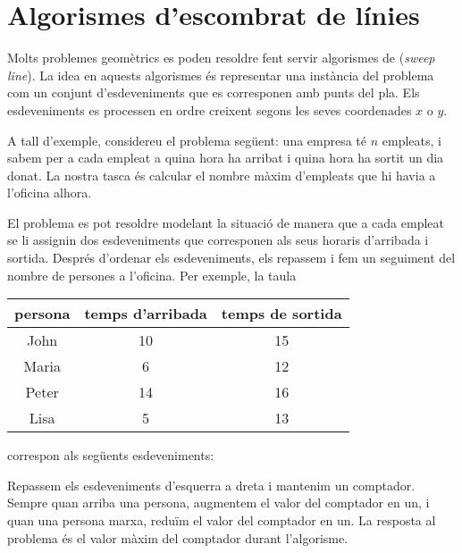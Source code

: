 \chapter{Algorismes d'escombrat de línies}


Molts problemes geomètrics es poden resoldre fent servir algorismes de
 (\emph{sweep line}). La idea en aquests
algorismes és representar una instància del problema com un conjunt
d'esdeveniments que es corresponen amb punts del pla. Els
esdeveniments es processen en ordre creixent segons les seves
coordenades $x$ o $y$.

A tall d'exemple, considereu el problema següent: una empresa té $n$
empleats, i sabem per a cada empleat a quina hora ha arribat i quina
hora ha sortit un dia donat. La nostra tasca és calcular el nombre
màxim d'empleats que hi havia a l'oficina alhora.

El problema es pot resoldre modelant la situació de manera que a cada
empleat se li assignin dos esdeveniments que corresponen als seus
horaris d'arribada i sortida. Després d'ordenar els esdeveniments, els
repassem i fem un seguiment del nombre de persones a l'oficina. Per
exemple, la taula
\begin{center}
\begin{tabular}{ccc}
persona & temps d'arribada & temps de sortida \\
\hline
John & 10 & 15 \\
Maria & 6 & 12 \\
Peter & 14 & 16 \\
Lisa & 5 & 13 \\
\end{tabular}
\end{center}
correspon als següents esdeveniments:
\begin{center}
\end{center}
Repassem els esdeveniments d'esquerra a dreta i mantenim un
comptador. Sempre quan arriba una persona, augmentem el valor del
comptador en un, i quan una persona marxa, reduïm el valor del
comptador en un. La resposta al problema és el valor màxim del
comptador durant l'algorisme.

